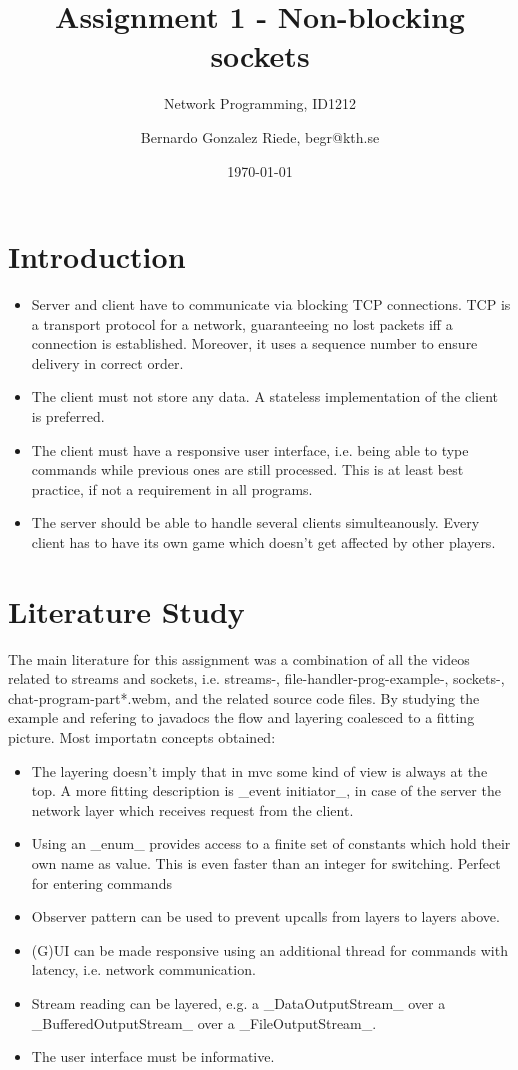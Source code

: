 \documentclass[a4paper]{scrartcl}
\title{Assignment 1 - Non-blocking sockets}
\subtitle{Network Programming, ID1212}
\author{Bernardo Gonzalez Riede, begr@kth.se}
\date{\today}
\begin{document}
\maketitle


\section{Introduction}


\begin{itemize}
    \item Server and client have to communicate via blocking TCP connections.
    TCP is a transport protocol for a network, guaranteeing no lost packets iff a connection is established.
    Moreover, it uses a sequence number to ensure delivery in correct order.
    \item The client must not store any data.
    A stateless implementation of the client is preferred.
    \item The client must have a responsive user interface, i.e. being able to type commands while previous ones are still processed.
    This is at least best practice, if not a requirement in all programs.
    \item The server should be able to handle several clients simulteanously.
    Every client has to have its own game which doesn't get affected by other players.
\end{itemize}


\section{Literature Study}

The main literature for this assignment was a combination of all the videos related to streams and sockets, i.e. streams-, file-handler-prog-example-,
    sockets-, chat-program-part*.webm, and the related source code files.
By studying the example and refering to javadocs the flow and layering coalesced to a fitting picture.
Most importatn concepts obtained:
\begin{itemize}
    \item The layering doesn't imply that in mvc some kind of view is always at the top.
    A more fitting description is _event initiator_, in case of the server the network layer which receives request from the client.
    \item Using an _enum_ provides access to a finite set of constants which hold their own name as value.
    This is even faster than an integer for switching.
    Perfect for entering commands
    \item Observer pattern can be used to prevent upcalls from layers to layers above.
    \item (G)UI can be made responsive using an additional thread for commands with latency, i.e. network communication.
    \item Stream reading can be layered, e.g. a _DataOutputStream_ over a _BufferedOutputStream_ over a _FileOutputStream_.
    \item The user interface must be informative.
\end{itemize}
\end{document}
